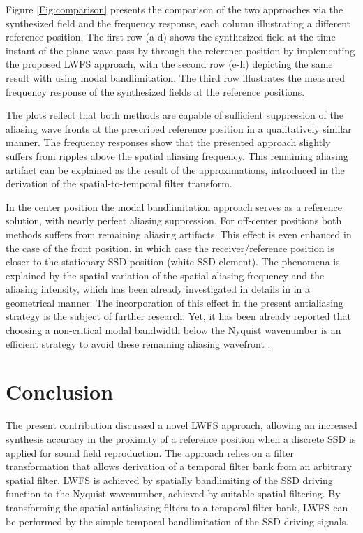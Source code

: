 \documentclass[conference]{IEEEtran}
\begin{document}
Figure \ref{Fig:comparison} presents the comparison of the two approaches via the synthesized field and the frequency response, each column illustrating a different reference position.
The first row (a-d) shows the synthesized field at the time instant of the plane wave pass-by through the reference position by implementing the proposed LWFS approach, with the second row (e-h) depicting the same result with using modal bandlimitation. 
The third row illustrates the measured frequency response of the synthesized fields at the reference positions.

The plots reflect that both methods are capable of sufficient suppression of the aliasing wave fronts at the prescribed reference position in a qualitatively similar manner.
The frequency responses show that the presented approach slightly suffers from ripples above the spatial aliasing frequency.
This remaining aliasing artifact can be explained as the result of the approximations, introduced in the derivation of the spatial-to-temporal filter transform.

In the center position the modal bandlimitation approach serves as a reference solution, with nearly perfect aliasing suppression.
For off-center positions both methods suffers from remaining aliasing artifacts.
This effect is even enhanced in the case of the front position, in which case the receiver/reference position is closer to the stationary SSD position (white SSD element).
The phenomena is explained by the spatial variation of the spatial aliasing frequency and the aliasing intensity, which has been already investigated in details in \cite{8611109} in a geometrical manner.
The incorporation of this effect in the present antialiasing strategy is the subject of further research. 
Yet, it has been already reported that choosing a non-critical modal bandwidth below the Nyquist wavenumber is an efficient strategy to avoid these remaining aliasing wavefront \cite{Hahn17:EUSIPCO}.

\section{Conclusion}
\label{sec:conclusion}

The present contribution discussed a novel LWFS approach, allowing an increased synthesis accuracy in the proximity of a reference position when a discrete SSD is applied for sound field reproduction.
The approach relies on a filter transformation that allows derivation of a temporal filter bank from an arbitrary spatial filter.
LWFS is achieved by spatially bandlimiting of the SSD driving function to the Nyquist wavenumber, achieved by suitable spatial filtering.
By transforming the spatial antialiasing filters to a temporal filter bank, LWFS can be performed by the simple temporal bandlimitation of the SSD driving signals.
\end{document}
